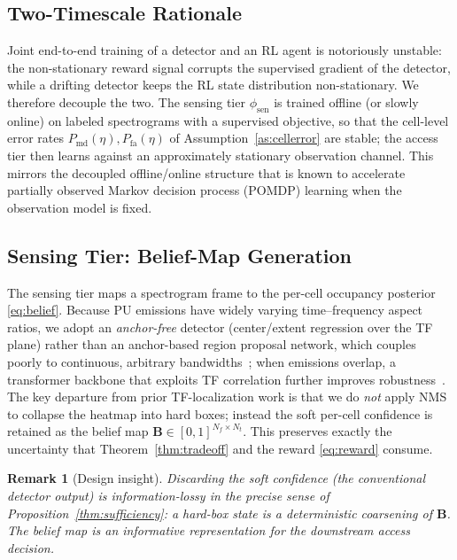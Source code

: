 \documentclass[journal]{IEEEtran}
\newtheorem{remark}{Remark}
\newcommand{\Nf}{N_f}                      %
\newcommand{\Nt}{N_t}                      %
\newcommand{\belmap}{\bm{B}}               %
\newcommand{\Pmd}{P_{\mathrm{md}}}         %
\newcommand{\Pfa}{P_{\mathrm{fa}}}         %
\newcommand{\thr}{\eta}                    %
\begin{document}
\subsection{Two-Timescale Rationale}
\label{subsec:twotimescale}
Joint end-to-end training of a detector and an RL agent is notoriously
unstable: the non-stationary reward signal corrupts the supervised gradient
of the detector, while a drifting detector keeps the RL state distribution
non-stationary. We therefore decouple the two. The sensing tier
$\phi_{\mathrm{sen}}$ is trained offline (or slowly online) on labeled
spectrograms with a supervised objective, so that the cell-level error rates
$\Pmd(\thr),\Pfa(\thr)$ of Assumption~\ref{as:cellerror} are stable; the
access tier then learns against an approximately stationary observation
channel. This mirrors the decoupled offline/online structure that is known
to accelerate partially observed Markov decision process (POMDP) learning
when the observation model is fixed.

\subsection{Sensing Tier: Belief-Map Generation}
\label{subsec:sensing_tier}
The sensing tier maps a spectrogram frame to the per-cell occupancy
posterior \eqref{eq:belief}. Because PU emissions have widely varying
time--frequency aspect ratios, we adopt an \emph{anchor-free} detector
(center/extent regression over the TF plane) rather than an anchor-based
region proposal network, which couples poorly to continuous, arbitrary
bandwidths~\cite{zhao2024uav}; when emissions overlap, a transformer backbone
that exploits TF correlation further improves
robustness~\cite{zhao2025trtfl_ssl}. The key departure from prior
TF-localization work is that we do \emph{not} apply NMS
to collapse the heatmap into hard boxes; instead the soft per-cell confidence
is retained as the belief map $\belmap\in[0,1]^{\Nf\times\Nt}$. This
preserves exactly the uncertainty that Theorem~\ref{thm:tradeoff} and the
reward \eqref{eq:reward} consume.

\begin{remark}[Design insight]
Discarding the soft confidence (the conventional detector output) is
information-lossy in the precise sense of Proposition~\ref{thm:sufficiency}: a
hard-box state is a deterministic coarsening of $\belmap$. The belief map is
an informative representation for the downstream access decision.
\end{remark}
\end{document}
